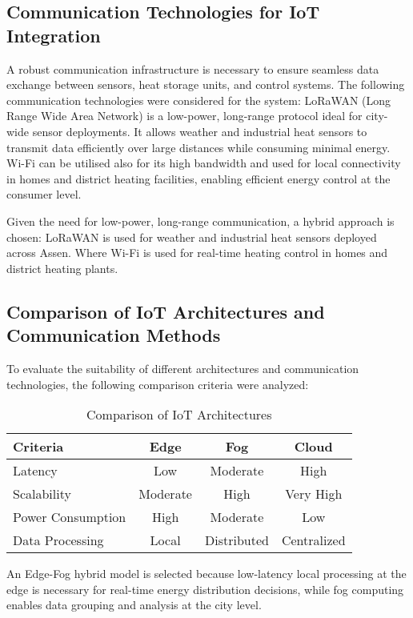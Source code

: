 \documentclass{article}
\begin{document}
\subsection{Communication Technologies for IoT Integration}

A robust communication infrastructure is necessary to ensure seamless data exchange between sensors, heat storage units, and control systems. The following communication technologies were considered for the system:
LoRaWAN (Long Range Wide Area Network) is a low-power, long-range protocol ideal for city-wide sensor deployments. It allows weather and industrial heat sensors to transmit data efficiently over large distances while consuming minimal energy.
Wi-Fi can be utilised also for its high bandwidth and used for local connectivity in homes and district heating facilities, enabling efficient energy control at the consumer level.

Given the need for low-power, long-range communication, a hybrid approach is chosen:
LoRaWAN is used for weather and industrial heat sensors deployed across Assen. Where Wi-Fi is used for real-time heating control in homes and district heating plants.

\subsection{Comparison of IoT Architectures and Communication Methods}

To evaluate the suitability of different architectures and communication technologies, the following comparison criteria were analyzed:

\begin{table}[h]
\centering
\caption{Comparison of IoT Architectures}
\begin{tabular}{|l|c|c|c|}
\hline
\textbf{Criteria} & \textbf{Edge} & \textbf{Fog} & \textbf{Cloud} \\
\hline
Latency & Low & Moderate & High \\
Scalability & Moderate & High & Very High \\
Power Consumption & High & Moderate & Low \\
Data Processing & Local & Distributed & Centralized \\
\hline
\end{tabular}
\end{table}

An Edge-Fog hybrid model is selected because low-latency local processing at the edge is necessary for real-time energy distribution decisions, while fog computing enables data grouping and analysis at the city level.
\end{document}
